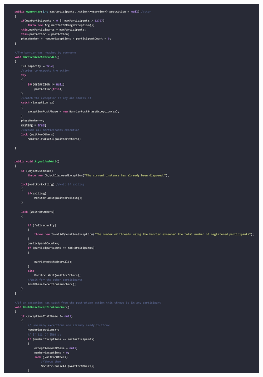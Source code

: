 \documentclass[10pt]{article} %
\begin{document}
\begin{center}
	\includegraphics[width=15cm]{Philosopher_Live2.jpg}
\end{center}
\end{document}
